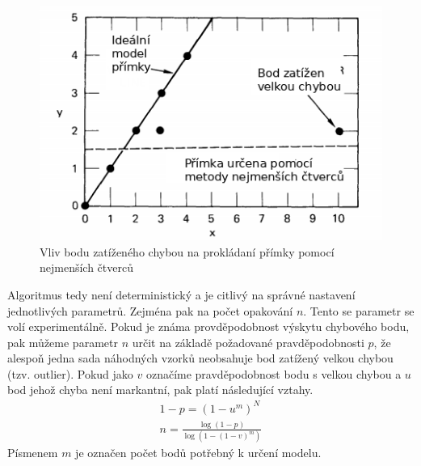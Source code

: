 \documentclass[twoside]{ctuthesis}
\newcommand{\minsp}[3]{$\mathbb{#1} \in \mathbb{#2}^{#3}$}
\newcommand{\tl}[1]{$\mathbf{#1}$}
\begin{document}
\begin{figure}
    \centering
    \includegraphics[width = 0.6 \linewidth]{pictures/ransac_least_squares.png}
    \caption{Vliv bodu zatíženého chybou na prokládaní přímky pomocí nejmenších čtverců \cite{fischler1981random}}
    \label{fig:least_squares_error}
\end{figure}
Algoritmus tedy není deterministický a je citlivý na správné nastavení jednotlivých parametrů. Zejména pak na počet opakování $n$. Tento se parametr se volí experimentálně. Pokud je známa provděpodobnost výskytu chybového bodu, pak můžeme parametr $n$ určit na základě požadované pravděpodobnosti $p$, že alespoň jedna sada náhodných vzorků neobsahuje bod zatížený velkou chybou (tzv. outlier). Pokud jako $v$ označíme pravděpodobnost bodu s velkou chybou a $u$ bod jehož chyba není markantní, pak platí následující vztahy. \cite{fischler1981random}
\begin{align}
    1 - p = (1 - u^m)^N \\
    n = \frac{\log(1 - p)}{\log(1 - (1 - v)^m)}
\end{align}
Písmenem $m$ je označen počet bodů potřebný k určení modelu. 



\end{document}
